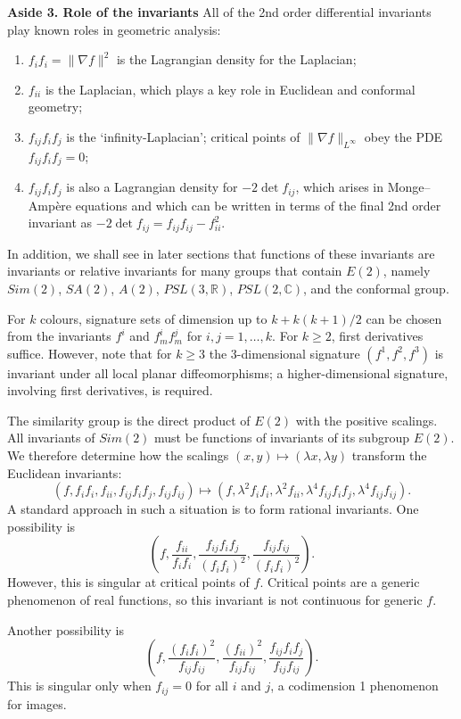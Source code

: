 \documentclass{article}
\begin{document}
{\narrower\small 
{\bf Aside 3. Role of the invariants} 
All of the 2nd order differential invariants play known roles in geometric analysis:
\begin{enumerate}
\item $f_if_i=\|\nabla f\|^2$ is the Lagrangian density for the Laplacian;
\item $f_{ii}$ is the Laplacian, which plays a key role in Euclidean and conformal geometry;
\item $f_{ij}f_i f_j$ is the `infinity-Laplacian'; critical points of $\|\nabla f\|_{L^\infty}$ obey the PDE $f_{ij}f_i f_j=0$;
\item
$f_{ij}f_i f_j$ is also a Lagrangian density for $-2\det f_{ij}$, which arises in Monge--Amp\`ere equations and
which can be written in terms of the final 2nd order invariant as $-2 \det f_{ij} = f_{ij}f_{ij}-f_{ii}^2$.
\end{enumerate}
In addition, we shall see in later sections that functions of these invariants are invariants or
relative invariants for many groups that contain $E(2)$, namely $Sim(2)$, $SA(2)$, $A(2)$, $PSL(3,\mathbb{R})$, $PSL(2,\mathbb{C})$, and the conformal group.
}

\medskip

For $k$ colours, signature sets of dimension up to $k + k(k+1)/2$ can be 
chosen from the invariants $f^i$ and $f^i_m f^j_m$ for $i,j=1,\dots, k$.
For $k\ge 2$, first derivatives suffice. However, note that for
$k\ge 3$ the 3-dimensional signature $(f^1,f^2,f^3)$ 
is invariant under all local planar diffeomorphisms; a higher-dimensional
signature, involving first derivatives, is required.

The similarity group is the direct product of $E(2)$ with the positive scalings.
All invariants of $Sim(2)$ must be functions of invariants of its subgroup $E(2)$. We therefore
determine how the scalings $(x,y) \mapsto (\lambda x,\lambda y)$ transform the Euclidean invariants:
$$ (f, f_i f_i, f_{ii}, f_{ij}f_if_j, f_{ij}f_{ij}) \mapsto (f, \lambda^2 f_i f_i, \lambda^2 f_{ii}, \lambda^4 f_{ij}f_i f_j, 
\lambda^4 f_{ij}f_{ij}).$$
A standard approach in such a situation is to form rational invariants. One possibility is
$$\left(f, \frac{f_{ii}}{f_i f_i}, \frac{f_{ij}f_i f_j}{(f_i f_i)^2}, \frac{f_{ij}f_{ij}}{(f_i f_i)^2}\right).$$
However, this is singular at critical points of $f$. Critical points are a generic phenomenon of real
functions, so this invariant is not continuous for generic $f$.

Another possibility is
$$\left(f, \frac{(f_i f_i)^2}{f_{ij}f_{ij}}, \frac{(f_{ii})^2}{f_{ij}f_{ij}}, \frac{f_{ij}f_i f_j}{f_{ij}f_{ij}}\right).$$
This is singular only when $f_{ij}=0$ for all $i$ and $j$, a codimension 1 phenomenon for images.
\end{document}

